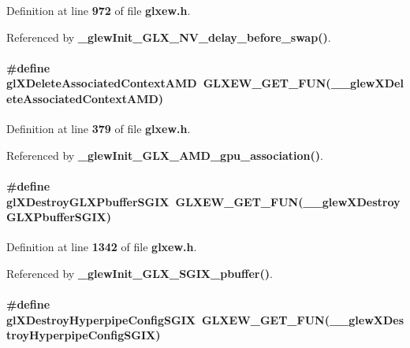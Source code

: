 Definition at line {\bf 972} of file {\bf glxew.\+h}.



Referenced by {\bf \+\_\+glew\+Init\+\_\+\+G\+L\+X\+\_\+\+N\+V\+\_\+delay\+\_\+before\+\_\+swap()}.

\paragraph[{gl\+X\+Delete\+Associated\+Context\+A\+MD}]{\setlength{\rightskip}{0pt plus 5cm}\#define gl\+X\+Delete\+Associated\+Context\+A\+MD~{\bf G\+L\+X\+E\+W\+\_\+\+G\+E\+T\+\_\+\+F\+UN}({\bf \+\_\+\+\_\+glew\+X\+Delete\+Associated\+Context\+A\+MD})}\label{glxew_8h_a4a2b63e2ccd2a7dffaa3faa3b17cdd3b}


Definition at line {\bf 379} of file {\bf glxew.\+h}.



Referenced by {\bf \+\_\+glew\+Init\+\_\+\+G\+L\+X\+\_\+\+A\+M\+D\+\_\+gpu\+\_\+association()}.

\paragraph[{gl\+X\+Destroy\+G\+L\+X\+Pbuffer\+S\+G\+IX}]{\setlength{\rightskip}{0pt plus 5cm}\#define gl\+X\+Destroy\+G\+L\+X\+Pbuffer\+S\+G\+IX~{\bf G\+L\+X\+E\+W\+\_\+\+G\+E\+T\+\_\+\+F\+UN}({\bf \+\_\+\+\_\+glew\+X\+Destroy\+G\+L\+X\+Pbuffer\+S\+G\+IX})}\label{glxew_8h_a0ca5e9068c45bce05272c7c0e48d8e32}


Definition at line {\bf 1342} of file {\bf glxew.\+h}.



Referenced by {\bf \+\_\+glew\+Init\+\_\+\+G\+L\+X\+\_\+\+S\+G\+I\+X\+\_\+pbuffer()}.

\paragraph[{gl\+X\+Destroy\+Hyperpipe\+Config\+S\+G\+IX}]{\setlength{\rightskip}{0pt plus 5cm}\#define gl\+X\+Destroy\+Hyperpipe\+Config\+S\+G\+IX~{\bf G\+L\+X\+E\+W\+\_\+\+G\+E\+T\+\_\+\+F\+UN}({\bf \+\_\+\+\_\+glew\+X\+Destroy\+Hyperpipe\+Config\+S\+G\+IX})}\label{glxew_8h_a674cc673873c306a3dc842bdaa0957da}


